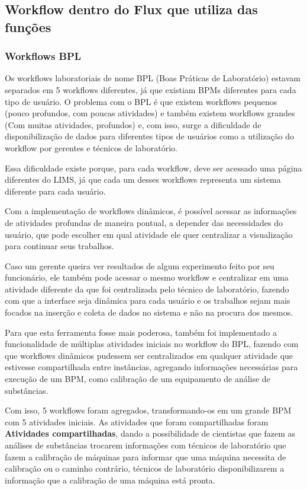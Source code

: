 \subsection{Workflow dentro do Flux que utiliza das funções}

\subsubsection{Workflows BPL}

Os workflows laboratoriais de nome BPL (Boas Práticas de Laboratório) estavam separados em 5 workflows diferentes, já que existiam BPMs diferentes para cada tipo de usuário.
O problema com o BPL é que existem workflows pequenos (pouco profundos, com poucas atividades) e também existem workflows grandes (Com muitas atividades, profundos) e, com isso, surge a dificuldade de disponibilização de dados para diferentes tipos de usuários como a utilização do workflow por gerentes e técnicos de laboratório.

Essa dificuldade existe porque, para cada workflow, deve ser acessado uma página diferentes do LIMS, já que cada um desses workflows representa um sistema diferente para cada usuário.

Com a implementação de workflows dinâmicos, é possível acessar as informações de atividades profundas de maneira pontual, a depender das necessidades do usuário, que pode escolher em qual atividade ele quer centralizar a visualização para continuar seus trabalhos.

Caso um gerente queira ver resultados de algum experimento feito por seu funcionário, ele também pode acessar o mesmo workflow e centralizar em uma atividade diferente da que foi centralizada pelo técnico de laboratório, fazendo com que a interface seja dinâmica para cada usuário e os trabalhos sejam mais focados na inserção e coleta de dados no sistema e não na procura dos mesmos.

Para que esta ferramenta fosse mais poderosa, também foi implementado a funcionalidade de múltiplas atividades iniciais no workflow do BPL, fazendo com que workflows dinâmicos pudessem ser centralizados em qualquer atividade que estivesse compartilhada entre instâncias, agregando informações necessárias para execução de um BPM, como calibração de um equipamento de análise de substâncias.

Com isso, 5 workflows foram agregados, transformando-os em um grande BPM com 5 atividades iniciais. As atividades que foram compartilhadas foram \textbf{Atividades compartilhadas}, dando a possibilidade de cientistas que fazem as análises de substâncias trocarem informações com técnicos de laboratório que fazem a calibração de máquinas para informar que uma máquina necessita de calibração ou o caminho contrário, técnicos de laboratório disponibilizarem a informação que a calibração de uma máquina está pronta.

